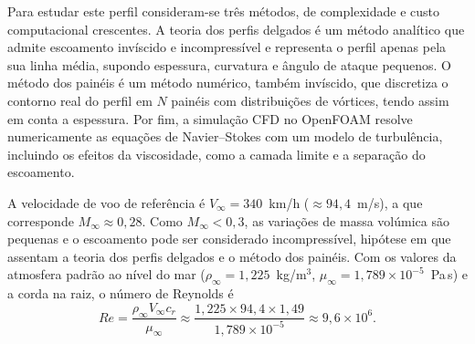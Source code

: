 Para estudar este perfil consideram-se três métodos, de complexidade e custo
computacional crescentes. A teoria dos perfis delgados é um método analítico que
admite escoamento invíscido e incompressível e representa o perfil apenas pela sua
linha média, supondo espessura, curvatura e ângulo de ataque pequenos. O método
dos painéis é um método numérico, também invíscido, que discretiza o contorno real
do perfil em $N$ painéis com distribuições de vórtices, tendo assim em conta a
espessura. Por fim, a simulação CFD no OpenFOAM resolve numericamente as
equações de Navier--Stokes com um modelo de turbulência, incluindo os efeitos da
viscosidade, como a camada limite e a separação do escoamento.

A velocidade de voo de referência é $V_\infty = 340$~km/h ($\approx 94{,}4$~m/s),
a que corresponde $M_\infty \approx 0{,}28$. Como
$M_\infty < 0{,}3$, as variações de massa volúmica são pequenas e o escoamento
pode ser considerado incompressível, hipótese em que assentam a
teoria dos perfis delgados e o método dos painéis. Com os valores da atmosfera
padrão ao nível do mar ($\rho_\infty = 1{,}225$~kg/m$^3$,
$\mu_\infty = 1{,}789\times10^{-5}$~Pa\,s) e a corda na raiz, o
número de Reynolds é
\[
  Re = \frac{\rho_\infty V_\infty c_r}{\mu_\infty}
     \approx \frac{1{,}225 \times 94{,}4 \times 1{,}49}{1{,}789\times10^{-5}}
     \approx 9{,}6\times10^{6}.
\]

